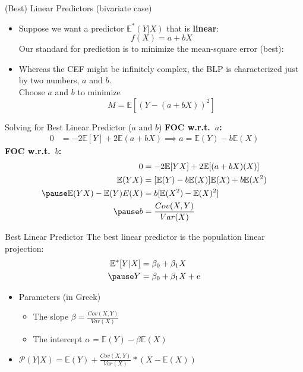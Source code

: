\documentclass[aspectratio=169]{beamer}
\numberwithin{equation}{section}
\begin{document}
\begin{frame}{(Best) Linear Predictors (bivariate case)}

\begin{itemize}
\item Suppose we want a predictor $ \mathbb{E}^{*}(Y|X)$ that is \textbf{linear}:
$$f(X)=a+bX$$\pause
Our standard for prediction is to minimize the mean-square error (best): \\
\item Whereas the CEF might be infinitely complex, the BLP is characterized just by two numbers, $a$ and $b$.\\
\pause
Choose $a$ and $b$ to minimize
$$M= \mathbb{E}[(Y-(a+bX))^2]$$
\end{itemize}
\end{frame}

\begin{frame}{Solving for Best Linear Predictor ($a$ and $b$)}
\textbf{FOC w.r.t.\ $a$:}\pause
\begin{align*}
0&=  -2 \mathbb{E}[Y]+2 \mathbb{E}(a+bX) \implies a= \mathbb{E}(Y)-b \mathbb{E}(X)
\end{align*}
\pause
\textbf{FOC w.r.t.\ $b$:}\pause
\begin{align*}
0&= -2 \mathbb{E}[YX]+2 \mathbb{E}[(a+bX)(X)]\\
 \mathbb{E}(YX)&= [ \mathbb{E}(Y)-b \mathbb{E}(X)] \mathbb{E}(X)+b \mathbb{E}(X^2)\\\pause
 \mathbb{E}(YX)- \mathbb{E}(Y)E(X)&= b[ \mathbb{E}(X^2)- \mathbb{E}(X)^2]\\\pause
b&=\frac{Cov(X,Y)}{Var(X)}\\
\end{align*}
\end{frame}


\begin{frame}{Best Linear Predictor}
The best linear predictor is the population linear projection:
\begin{align*}
 \mathbb{E}^{*}[Y|X]&=\beta_0+\beta_1X\\ \pause
Y&=\beta_0+\beta_1X+e
\end{align*}
\pause
\begin{itemize}
\item Parameters (in Greek)
\begin{itemize}
\item The slope $\beta =\frac{Cov(X,Y)}{Var(X)}$
\item The intercept $\alpha=\mathbb{E}(Y)-\beta \mathbb{E}(X)$
\end{itemize}
\item $\mathcal{P}(Y|X)= \mathbb{E}(Y)+\frac{Cov(X,Y)}{Var(X)}*(X-\mathbb{E}(X))$
\end{itemize}
\end{frame}
\end{document}

